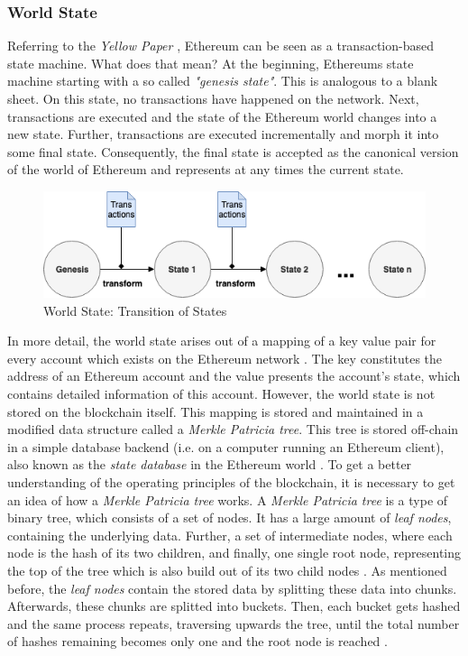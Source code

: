 \subsubsection{World State}
\label{sec:world_state}
Referring to the \textit{Yellow Paper} \cite{wood2014ethereum}, Ethereum can be seen as a transaction-based state machine. What does that mean? At the beginning, Ethereums state machine starting with a so called \textit{"genesis state"}. This is analogous to a blank sheet. On this state, no transactions have happened on the network. Next, transactions are executed and the state of the Ethereum world changes into a new state. Further, transactions are executed incrementally and morph it into some final state. Consequently, the final state is accepted as the canonical version of the world of Ethereum and represents at any times the current state.

\begin{figure}[htbp]
	\centering
	\includegraphics[width=.9\linewidth]{./figures/state_transition.png}
	\caption{World State: Transition of States}
	\label{figure:state_transition}
\end{figure}

In more detail, the world state arises out of a mapping of a key value pair for every account which exists on the Ethereum network \cite{wood2014ethereum}. The key constitutes the address of an Ethereum account and the value presents the account's state, which contains detailed information of this account. 
However, the world state is not stored on the blockchain itself. This mapping is stored and maintained in a modified data structure called a \textit{Merkle Patricia tree}. This tree is stored off-chain in a simple database backend (i.e. on a computer running an Ethereum client), also known as the \textit{state database} in the Ethereum world \cite{wood2014ethereum}. To get a better understanding of the operating principles of the blockchain, it is necessary to get an idea of how a \textit{Merkle Patricia tree} works. A \textit{Merkle Patricia tree} is a type of binary tree, which consists of a set of nodes. It has a large amount of 
\textit{leaf nodes}, containing the underlying data. Further, a set of intermediate nodes, where each node is the hash of its two children, and finally, one single root node, representing the top of the tree which is also build out of its two child nodes \cite{buterin2013next} \cite{wood2014ethereum}.
As mentioned before, the \textit{leaf nodes} contain the stored data by splitting these data into chunks. Afterwards, these chunks are splitted into buckets. Then, each bucket gets hashed and the same process repeats, traversing upwards the tree, until the total number of hashes remaining becomes only one and the root node is reached \cite{ethereum_blog}. 

